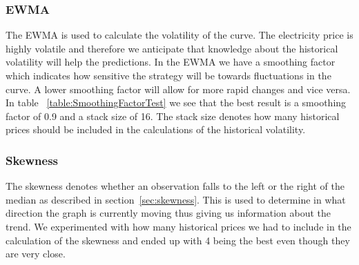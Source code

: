 \subsubsection{EWMA}
The EWMA is used to calculate the volatility of the curve. The electricity price is highly volatile and therefore we anticipate that knowledge about the historical volatility will help the predictions. In the EWMA we have a smoothing factor which indicates how sensitive the strategy will be towards fluctuations in the curve. A lower smoothing factor will allow for more rapid changes and vice versa. In table ~\ref{table:SmoothingFactorTest} we see that the best result is a smoothing factor of 0.9 and a stack size of 16. The stack size denotes how many historical prices should be included in the calculations of the historical volatility.

\begin{table}[H]
\centering  %
\caption{Smoothing factor test} %
\label{table:SmoothingFactorTest} %
\end{table}

\subsubsection{Skewness}
The skewness denotes whether an observation falls to the left or the right of the median as described in section~\ref{sec:skewness}. This is used to determine in what direction the graph is currently moving thus giving us information about the trend. We experimented with how many historical prices we had to include in the calculation of the skewness and ended up with 4 being the best even though they are very close.

